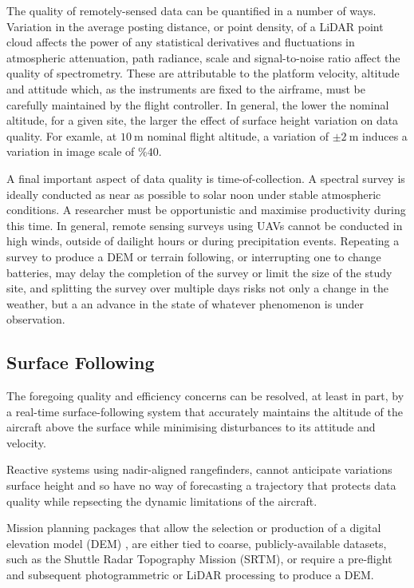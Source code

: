 \documentclass[doc]{apa6}
\begin{document}
The quality of remotely-sensed data can be quantified in a number of ways. Variation in the average posting distance, or point density, of a LiDAR point cloud affects the power of any statistical derivatives and fluctuations in atmospheric attenuation, path radiance, scale and signal-to-noise ratio affect the quality of spectrometry. These are attributable to the platform velocity, altitude and attitude which, as the instruments are fixed to the airframe, must be carefully maintained by the flight controller. In general, the lower the nominal altitude, for a given site, the larger the effect of surface height variation on data quality. For examle, at $\SI{10}\m$ nominal flight altitude, a variation of $\pm\SI{2}\m$ induces a variation in image scale of $\%40$.  

A final important aspect of data quality is time-of-collection. A spectral survey is ideally conducted as near as possible to solar noon under stable atmospheric conditions. A researcher must be opportunistic and maximise productivity during this time. In general, remote sensing surveys using UAVs cannot be conducted in high winds, outside of dailight hours or during precipitation events. Repeating a survey to produce a DEM or terrain following, or interrupting one to change batteries, may delay the completion of the survey or limit the size of the study site, and splitting the survey over multiple days risks not only a change in the weather, but a an advance in the state of whatever phenomenon is under observation. 


\subsection{Surface Following}

The foregoing quality and efficiency concerns can be resolved, at least in part, by a real-time surface-following system that accurately maintains the altitude of the aircraft above the surface while minimising disturbances to its attitude and velocity. 

Reactive systems using nadir-aligned rangefinders, cannot anticipate variations surface height and so have no way of forecasting a trajectory that protects data quality while repsecting the dynamic limitations of the aircraft.

Mission planning packages that allow the selection or production of a digital elevation model (DEM) \parencite[e.g.,][]{PrecisionHawk2018,UgCS2018,MapsMadeEasy2018}, are either tied to coarse, publicly-available datasets, such as the Shuttle Radar Topography Mission (SRTM), or require a pre-flight and subsequent photogrammetric or LiDAR processing to produce a DEM. 
\end{document}
